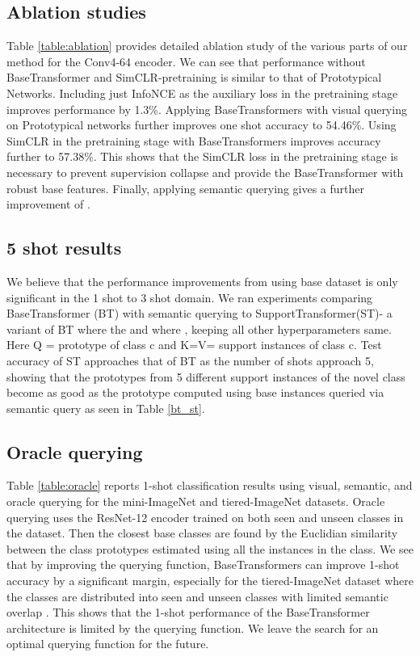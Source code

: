 \documentclass{bmvc2k}
\begin{document}
\subsection{Ablation studies}
Table \ref{table:ablation} provides detailed ablation study of the various parts of our method for the Conv4-64 encoder. We can see that performance without BaseTransformer and SimCLR-pretraining is similar to that of Prototypical Networks. Including just InfoNCE as the auxiliary loss in the pretraining stage improves performance by 1.3\%. Applying BaseTransformers with visual querying on Prototypical networks further improves one shot accuracy to 54.46\%. Using SimCLR in the pretraining stage with BaseTransformers improves accuracy further to 57.38\%. This shows that the SimCLR loss in the pretraining stage is necessary to prevent supervision collapse and provide the BaseTransformer with robust base features. Finally, applying semantic querying gives a further improvement of .

\subsection{5 shot results}\label{sec:5shot}
We believe that the performance improvements from using base dataset is only significant in the 1 shot to 3 shot domain. We ran experiments comparing BaseTransformer (BT) with semantic querying to SupportTransformer(ST)- a variant of BT where the  and   where , keeping all other hyperparameters same. Here Q = prototype of class c and K=V= support instances of class c.
Test accuracy of ST approaches that of BT as the number of shots approach 5, showing that the prototypes from 5 different support instances of the novel class become as good as the prototype computed using base instances queried via semantic query as seen in Table \ref{bt_st}.

\subsection{Oracle querying}\label{sec:oracle_q}
Table \ref{table:oracle} reports 1-shot classification results using visual, semantic, and oracle querying for the mini-ImageNet and tiered-ImageNet datasets. Oracle querying uses the ResNet-12 encoder trained on both seen and unseen classes in the dataset. Then the closest base classes are found by the Euclidian similarity between the class prototypes estimated using all the instances in the class. We see that by improving the querying function, BaseTransformers can improve 1-shot accuracy by a significant margin, especially for the tiered-ImageNet dataset where the classes are distributed into seen and unseen classes with limited semantic overlap \cite{oreshkin2018tadam}. This shows that the 1-shot performance of the BaseTransformer architecture is limited by the querying function. We leave the search for an optimal querying function for the future.
\end{document}
